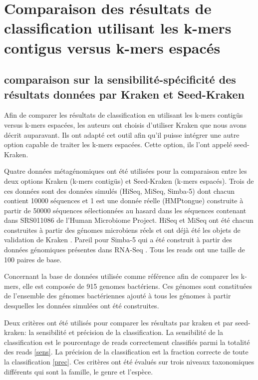 \section{Comparaison des résultats de classification utilisant les k-mers contigus versus k-mers espacés}


\subsection{comparaison sur la sensibilité-spécificité des résultats données par Kraken et Seed-Kraken}
          
          Afin de comparer les résultats de classification en utilisant les k-mers contigüs versus k-mers espacées, les auteurs ont choisis d'utiliser Kraken \cite{Wood2014} que nous avons décrit auparavant. Ils ont adapté cet outil afin qu'il puisse intégrer une autre option capable de traiter les k-mers espacées. Cette option, ils l'ont appelé seed-Kraken.
          
          Quatre données métagénomiques ont été utilisées pour la comparaison entre les deux options Kraken (k-mers contigüs) et Seed-Kraken (k-mers espacés). Trois de ces données sont des données simulés (HiSeq, MiSeq, Simba-5) dont chacun contient 10000 séquences et 1 est une donnée réelle (HMPtongue) construite à partir de 50000 séquences sélectionnées au hasard dans les séquences contenant dans SRS011086 de l'Human Microbiome Project. HiSeq et MiSeq ont été chacun construites à partir des génomes microbiens réels \cite{Wood2014} et ont déjà été les objets de validation de Kraken \cite{Wood20014}. Pareil pour Simba-5 qui a été construit à partir des données génomiques présentes dans RNA-Seq  \cite{Wood20014}. Tous les reads ont une taille de 100 paires de base.

          Concernant la base de données utilisée comme référence afin de comparer les k-mers, elle est composée de 915 genomes bactériens. Ces génomes sont constituées de l'ensemble des génomes bactériennes ajouté à tous les génomes à partir desquelles les données simulées ont été construites.

          Deux critères ont été utilisés pour comparer les résultats par kraken et par seed-kraken: la sensibilité et précision de la classification. La sensibilité de la classification est le pourcentage de reads correctement classifiés parmi la totalité des reads \eqref{sens}. La précision de la classification est la fraction correcte de toute la classification \eqref{prec}. Ces critères ont été évalués sur trois niveaux taxonomiques différents qui sont la famille, le genre et l'espèce.

